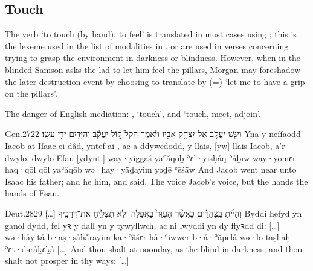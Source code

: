 \subsection{Touch}


\begin{paper}
	{\click} The verb  ‘to touch (by hand), to feel’ is translated in most cases using ; this is the lexeme used in the list of modalities in .  or  are used in verses concerning trying to grasp the environment in darkness or blindness. However, when in  the blinded Samson asks the lad to let him feel the pillars, Morgan may foreshadow the later destruction event by choosing to translate  by  (=) ‘let me to have a grip on the pillars’.

	\begin{leftbar}
		\begin{compactitem}
			\item The danger of English mediation: , ‘touch’, and  ‘touch, meet, adjoin’.
		\end{compactitem}
	\end{leftbar}
\end{paper}

\begin{example}{Gen.}{27}{22}{}{}
	\quoling
	{וַיִּגַּ֧שׁ יַעֲקֹ֛ב אֶל־יִצְחָ֥ק אָבִ֖יו  וַיֹּ֗אמֶר הַקֹּל֙ ק֣וֹל יַעֲקֹ֔ב וְהַיָּדַ֖יִם יְדֵ֥י עֵשָֽׂו׃}
	{Yna y neſſaodd Iacob at Iſaac ei dâd, yntef ai , ac a ddywedodd, y llais, [yw] llais Iacob, a’r dwylo, dwylo Eſau [ydynt.]}
	{way·yiggaš yaʿăqōḇ ʾɛl·yiṣḥå̄q ʾå̄ḇīw  way·yōmɛr haq·qōl qōl yaʿăqōḇ wə·hay·yå̄ḏayim yəḏē ʿēśå̄w}
	{And Jacob went near unto Isaac his father; and he  him, and said, The voice  Jacob’s voice, but the hands  the hands of Esau.}
\end{example}

\begin{example}{Deut.}{28}{29}{}{}
	\quoling
	{וְהָיִ֜יתָ  בַּֽצָּהֳרַ֗יִם כַּאֲשֶׁ֨ר  הָעִוֵּר֙ בָּאֲפֵלָ֔ה וְלֹ֥א תַצְלִ֖יחַ אֶת־דְּרָכֶ֑יךָ […]׃}
	{Byddi hefyd yn  ganol dydd, fel yꝛ  y dall yn y tywyllwch, ac ni lwyddi yn dy ffyꝛdd di: […]}
	{wə·hå̄yīṯå̄  b·aṣ·ṣå̄hå̄̆rayim ka·ʾăšɛr  hå̄·ʿiwwēr b·å̄·ʾăp̄ēlå̄ wə·lō ṯaṣlīaḥ ʾɛṯ·dərå̄ḵɛḵå̄ […]}
	{And thou shalt  at noonday, as the blind  in darkness, and thou shalt not prosper in thy ways: […]}
\end{example}

